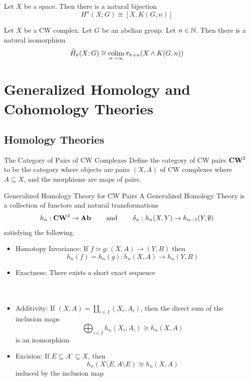 \documentclass[a4paper]{article}
\begin{document}
\begin{thm}{}{} Let $X$ be a space. Then there is a natural bijection $$H^n(X;G)\cong[X,K(G,n)]$$ 
\end{thm}

\begin{thm}{}{} Let $X$ be a CW complex. Let $G$ be an abelian group. Let $n\in\mathbb{N}$. Then there is a natural isomorphism $$\widetilde{H}_k(X;G)\cong\operatorname*{colim}_{n\to\infty}\pi_{k+n}(X\wedge K(G,n))$$
\end{thm}

\pagebreak
\section{Generalized Homology and Cohomology Theories}
\subsection{Homology Theories}
\begin{defn}{The Category of Pairs of CW Complexes}{} Define the category of CW pairs $\bold{CW}^2$ to be the category where objects are pairs $(X,A)$ of CW complexes where $A\subseteq X$, and the morphisms are maps of pairs. 
\end{defn}

\begin{defn}{Generalized Homology Theory for CW Pairs}{} A Generalized Homology Theory is a collection of functors and natural transformations $$h_n:\bold{CW}^2\to\bold{Ab}\;\;\;\;\;\;\;\text{ and }\;\;\;\;\;\;\;\delta_n:h_n(X,Y)\to h_{n-1}(Y,\emptyset)$$ satisfying the following. 
\begin{itemize}
\item Homotopy Invariance: If $f\simeq g:(X,A)\to(Y,B)$ then $$h_n(f)=h_n(g):h_n(X,A)\to h_n(Y,B)$$
\item Exactness: There exists a short exact sequence \\~\\
~\\
\item Additivity: If $(X,A)=\coprod_{i\in I}(X_i,A_i)$, then the direct sum of the inclusion maps $$\bigoplus_{i\in I}h_n(X_i,A_i)\cong h_n(X,A)$$ is an isomorphism
\item Excision: If $\overline{E}\subseteq A^\circ\subseteq X$, then $$h_n(X\setminus E,A\setminus E)\cong h_n(X,A)$$ induced by the inclusion map
\end{itemize}
\end{defn}
\end{document}
